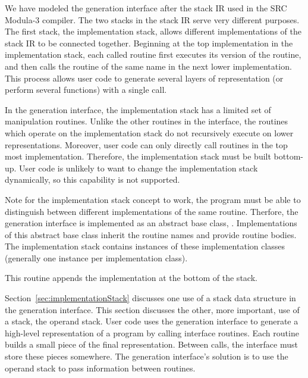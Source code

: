 We have modeled the generation interface after the stack IR used in
the SRC Modula-3 compiler.  The two stacks in the stack IR serve very
different purposes.  The first stack, the implementation stack, allows
different implementations of the stack IR to be connected together.
Beginning at the top implementation in the implementation stack, each
called routine first executes its version of the routine, and then
calls the routine of the same name in the next lower implementation.
This process allows user code to generate several layers of
representation (or perform several functions) with a single call.

In the generation interface, the implementation stack has a limited
set of manipulation routines.  Unlike the other routines in the
interface, the routines which operate on the implementation stack do
not recursively execute on lower representations.  Moreover, user code
can only directly call routines in the top most implementation.
Therefore, the implementation stack must be built bottom-up.  User
code is unlikely to want to change the implementation stack
dynamically, so this capability is not supported.

Note for the implementation stack concept to work, the program must be
able to distinguish between different implementations of the same
routine.  Therfore, the generation interface is implemented as an
abstract base class, .  Implementations of
this abstract base class inherit the routine names and provide routine
bodies.  The implementation stack contains instances of these
implementation classes (generally one instance per implementation class).

\begin{functionality}
This routine appends the implementation  at the bottom of the
stack. 
\end{functionality}

\label{sec:stack}

Section~\ref{sec:implementationStack} discusses one use of a stack
data structure in the generation interface.  This section discusses
the other, more important, use of a stack, the operand stack.  User
code uses the generation interface to generate a high-level
representation of a program by calling interface routines.  Each
routine builds a small piece of the final representation.  Between
calls, the interface must store these pieces somewhere.  The
generation interface's solution is to use the operand stack to pass
information between routines.

